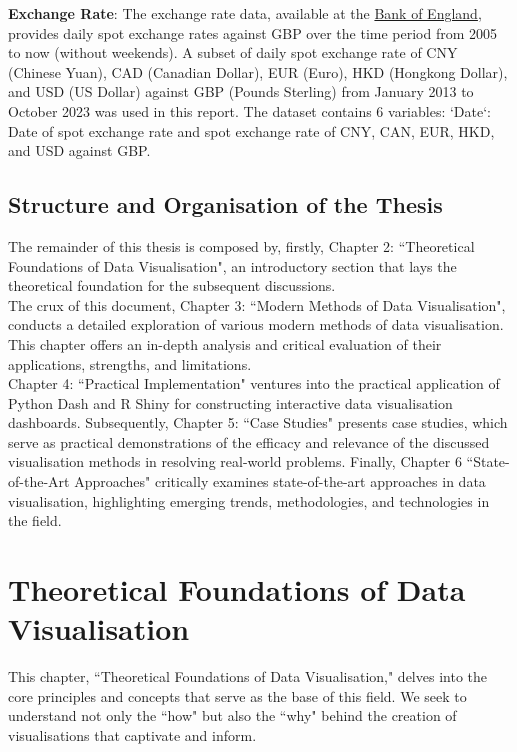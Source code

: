 \documentclass{article}\usepackage[]{graphicx}\usepackage[]{xcolor}
\begin{document}
\noindent
\textbf{Exchange Rate}: The exchange rate data, available at the \href{https://www.bankofengland.co.uk/boeapps/database/index.asp?first=yes&SectionRequired=I&HideNums=-1&ExtraInfo=true&Travel=NIx}{Bank of England}, provides daily spot exchange rates against GBP over the time period from 2005 to now (without weekends). A subset of daily spot exchange rate of CNY (Chinese Yuan), CAD (Canadian Dollar), EUR (Euro), HKD (Hongkong Dollar), and USD (US Dollar) against GBP (Pounds Sterling) from January 2013 to October 2023 was used in this report. The dataset contains 6 variables: `Date`: Date of spot exchange rate and spot exchange rate of CNY, CAN, EUR, HKD, and USD against GBP.\\


\subsection{Structure and Organisation of the Thesis}

The remainder of this thesis is composed by, firstly, Chapter 2: ``Theoretical Foundations of Data Visualisation", an introductory section that lays the theoretical foundation for the subsequent discussions.\\

\noindent 
The crux of this document, Chapter 3: ``Modern Methods of Data Visualisation", conducts a detailed exploration of various modern methods of data visualisation. This chapter offers an in-depth analysis and critical evaluation of their applications, strengths, and limitations.\\

\noindent 
Chapter 4: ``Practical Implementation" ventures into the practical application of Python Dash and R Shiny for constructing interactive data visualisation dashboards. Subsequently, Chapter 5: ``Case Studies" presents case studies, which serve as practical demonstrations of the efficacy and relevance of the discussed visualisation methods in resolving real-world problems. Finally, Chapter 6 ``State-of-the-Art Approaches" critically examines state-of-the-art approaches in data visualisation, highlighting emerging trends, methodologies, and technologies in the field.

\newpage 


\section{Theoretical Foundations of Data Visualisation}
This chapter, ``Theoretical Foundations of Data Visualisation," delves into the core principles and concepts that serve as the base of this field. We seek to understand not only the ``how" but also the ``why" behind the creation of visualisations that captivate and inform.
\end{document}
